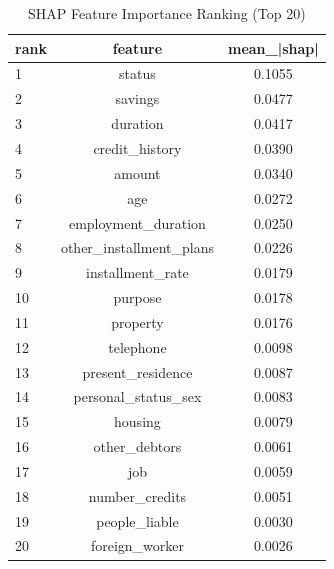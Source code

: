 \begin{table}
\centering
\caption{SHAP Feature Importance Ranking (Top 20)}
\label{tab:shap_ranking}
\begin{tabular}{lcc}
\toprule
rank & feature & mean_|shap| \\
\midrule
1 & status & 0.1055 \\
2 & savings & 0.0477 \\
3 & duration & 0.0417 \\
4 & credit_history & 0.0390 \\
5 & amount & 0.0340 \\
6 & age & 0.0272 \\
7 & employment_duration & 0.0250 \\
8 & other_installment_plans & 0.0226 \\
9 & installment_rate & 0.0179 \\
10 & purpose & 0.0178 \\
11 & property & 0.0176 \\
12 & telephone & 0.0098 \\
13 & present_residence & 0.0087 \\
14 & personal_status_sex & 0.0083 \\
15 & housing & 0.0079 \\
16 & other_debtors & 0.0061 \\
17 & job & 0.0059 \\
18 & number_credits & 0.0051 \\
19 & people_liable & 0.0030 \\
20 & foreign_worker & 0.0026 \\
\bottomrule
\end{tabular}
\end{table}
